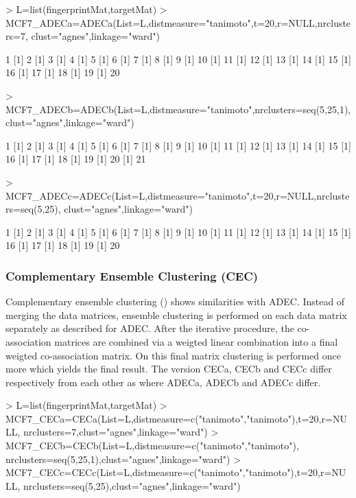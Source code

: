 \documentclass[a4paper]{article}
\begin{document}
\begin{Schunk}
\begin{Sinput}
> L=list(fingerprintMat,targetMat)
> MCF7_ADECa=ADECa(List=L,distmeasure="tanimoto",t=20,r=NULL,nrclusters=7,
                  clust="agnes",linkage="ward")
\end{Sinput}
\begin{Soutput}
[1] 1
[1] 2
[1] 3
[1] 4
[1] 5
[1] 6
[1] 7
[1] 8
[1] 9
[1] 10
[1] 11
[1] 12
[1] 13
[1] 14
[1] 15
[1] 16
[1] 17
[1] 18
[1] 19
[1] 20
\end{Soutput}
\begin{Sinput}
> MCF7_ADECb=ADECb(List=L,distmeasure="tanimoto",nrclusters=seq(5,25,1),
 		         clust="agnes",linkage="ward")
\end{Sinput}
\begin{Soutput}
[1] 1
[1] 2
[1] 3
[1] 4
[1] 5
[1] 6
[1] 7
[1] 8
[1] 9
[1] 10
[1] 11
[1] 12
[1] 13
[1] 14
[1] 15
[1] 16
[1] 17
[1] 18
[1] 19
[1] 20
[1] 21
\end{Soutput}
\begin{Sinput}
> MCF7_ADECc=ADECc(List=L,distmeasure="tanimoto",t=20,r=NULL,nrclusters=seq(5,25),
 		         clust="agnes",linkage="ward")
\end{Sinput}
\begin{Soutput}
[1] 1
[1] 2
[1] 3
[1] 4
[1] 5
[1] 6
[1] 7
[1] 8
[1] 9
[1] 10
[1] 11
[1] 12
[1] 13
[1] 14
[1] 15
[1] 16
[1] 17
[1] 18
[1] 19
[1] 20
\end{Soutput}
\end{Schunk}
\subsubsection{Complementary Ensemble Clustering (CEC)}
Complementary ensemble clustering (\cite{Fodeh2013})
shows similarities with ADEC. Instead of merging the data matrices, ensemble
clustering is performed on each data matrix separately as described for ADEC.
After the iterative procedure, the co-association matrices are combined via a
weigted linear combination into a final weigted co-association matrix. On this
final matrix clustering is performed once more which yields the final result.
The version CECa, CECb and CECc differ respectively from each other as where
ADECa, ADECb and ADECc differ.
\begin{Schunk}
\begin{Sinput}
> L=list(fingerprintMat,targetMat)
> MCF7_CECa=CECa(List=L,distmeasure=c("tanimoto","tanimoto"),t=20,r=NULL,
                nrclusters=7,clust="agnes",linkage="ward")
> MCF7_CECb=CECb(List=L,distmeasure=c("tanimoto","tanimoto"),
                nrclusters=seq(5,25,1),clust="agnes",linkage="ward") 
> MCF7_CECc=CECc(List=L,distmeasure=c("tanimoto","tanimoto"),t=20,r=NULL,
                nrclusters=seq(5,25),clust="agnes",linkage="ward")		 
\end{Sinput}
\end{Schunk}
\end{document}
